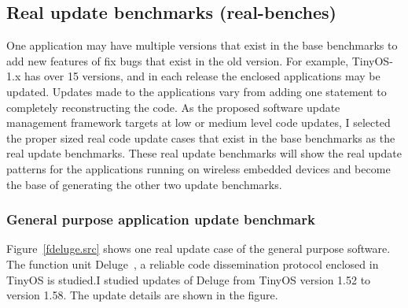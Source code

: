 \subsection{Real update benchmarks (real-benches)}
One application may have multiple versions that exist in the
base benchmarks to add new features of fix bugs that exist 
in the old version.
For example, TinyOS-1.x has over 15 versions, and in each release
the enclosed applications may be updated.
Updates made to the applications vary from adding one statement
to completely reconstructing the code.
As the proposed software update management framework targets
at low or medium level code updates, I selected the proper sized real code
update cases that exist in the base benchmarks as the real update
benchmarks.
These real update benchmarks will show the real update patterns
for the applications running on wireless embedded devices and
become the base of generating the other two update benchmarks.

\subsubsection{General purpose application update benchmark}
Figure~\ref{fdeluge.src} shows one real update case of the general purpose
software.
The function unit Deluge~\cite{deluge}, a reliable code dissemination protocol
enclosed in TinyOS is studied.I studied updates of Deluge from TinyOS version 1.52 
to version 1.58. The update details are shown in the figure.

